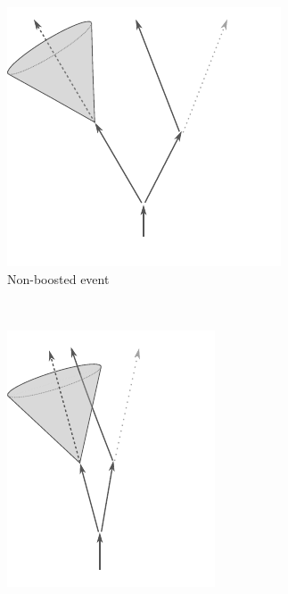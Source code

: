 \begin{figure}
  \begin{subfigure}[b]{0.45\textwidth}
    \includegraphics[width=\textwidth]{PartBoosted/Plots/NonBoosted.pdf}
    \caption{Non-boosted event} \label{fig:NonBoostedDiagram}
  \end{subfigure}%
  ~ 
  \begin{subfigure}[b]{0.45\textwidth}
    \includegraphics[width=\textwidth]{PartBoosted/Plots/Boosted.pdf}

\end{subfigure}
\end{figure}
